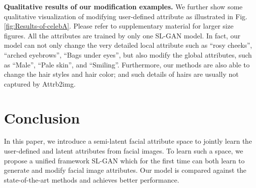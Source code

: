 \documentclass[10pt,letterpaper,twocolumn]{article}
\begin{document}
\noindent \textbf{Qualitative results of our modification examples.
}We further show some qualitative visualization of modifying user-defined
attribute as illustrated in Fig. \ref{fig:Results-of-celebA}. Please
refer to supplementary material for larger size figures. All the attributes
are trained by only one SL-GAN model. In fact, our model can not only
change the very detailed local attribute such as ``rosy cheeks'',
``arched eyebrows'', ``Bags under eyes'', but also modify the
global attributes, such as ``Male'', ``Pale skin'', and ``Smiling''.
Furthermore, our methods are also able to change the hair styles and
hair color; and such details of hairs are usually not captured by
Attrb2img.

\section{Conclusion }

In this paper, we introduce a semi-latent facial attribute space to
jointly learn the user-defined and latent attributes from facial images.
To learn such a space, we propose a unified framework\textendash{}
SL-GAN which for the first time can both learn to generate and modify
facial image attributes. Our model is compared against the state-of-the-art
methods and achieves better performance.

{\small{}{} 

 }{\small \par}
\end{document}
